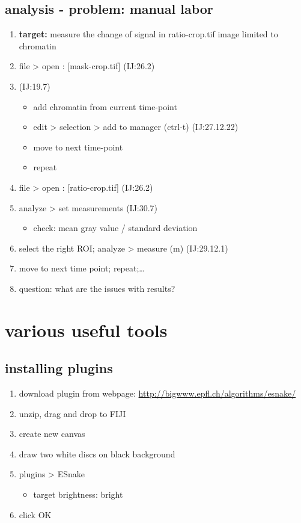\documentclass[11pt]{article}
\begin{document}
\subsection{analysis - problem: manual labor}
\label{sec-9-8}
\begin{enumerate}
\item \textbf{target:} measure the change of signal in ratio-crop.tif image limited
to chromatin
\item file > open : [mask-crop.tif] (IJ:26.2)
\item{} (IJ:19.7)
\begin{itemize}
\item add chromatin from current time-point
\item edit > selection > add to manager (ctrl-t) (IJ:27.12.22)
\item move to next time-point
\item repeat
\end{itemize}
\item file > open : [ratio-crop.tif] (IJ:26.2)
\item analyze > set measurements (IJ:30.7)
\begin{itemize}
\item check: mean gray value / standard deviation
\end{itemize}
\item select the right ROI; analyze > measure (m) (IJ:29.12.1)
\item move to next time point; repeat;\ldots{}
\item question: what are the issues with results?
\end{enumerate}
\section{various useful tools}
\label{sec-10}
\subsection{installing plugins}
\label{sec-10-1}
\begin{enumerate}
\item download plugin from webpage:
\url{http://bigwww.epfl.ch/algorithms/esnake/}
\item unzip, drag and drop to FIJI
\item create new canvas
\item draw two white discs on black background
\item plugins > ESnake
\begin{itemize}
\item target brightness: bright
\end{itemize}
\item click OK
\end{enumerate}
\end{document}
